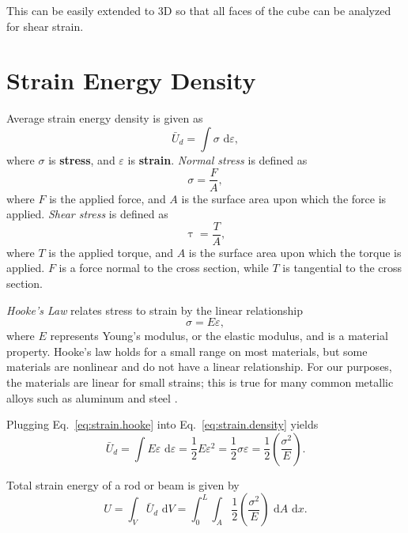This can be easily extended to 3D so that all faces of the cube can be analyzed for shear strain.

\section{Strain Energy Density}
Average strain energy density is given as
\begin{equation}
\bar U_d = \int \sigma \text{ d}\varepsilon,
\label{eq:strain.density}
\end{equation}
where $\sigma$ is \textbf{stress}, and $\varepsilon$ is \textbf{strain}. \emph{Normal stress} is defined as
\begin{equation}
\sigma = \frac{F}{A},
\label{eq:stress.force}
\end{equation}
where $F$ is the applied force, and $A$ is the surface area upon which the force is applied. 
\emph{Shear stress} is defined as
\begin{equation}
\uptau = \frac{T}{A},
\end{equation}
where $T$ is the applied torque, and $A$ is the surface area upon which the torque is applied. $F$ is a force normal to the cross section, while $T$ is tangential to the cross section.

\emph{Hooke's Law} relates stress to strain by the linear relationship
\begin{equation}
\sigma = E\varepsilon,
\label{eq:strain.hooke}
\end{equation}
where $E$ represents Young's modulus, or the elastic modulus, and is a material property. Hooke's law holds for a small range on most materials, but some materials are nonlinear and do not have a linear relationship. For our purposes, the materials are linear for small strains; this is true for many common metallic alloys such as aluminum and steel \cite{boulderstrain5}.

Plugging Eq.~\ref{eq:strain.hooke} into Eq.~\ref{eq:strain.density} yields
\begin{equation}
\bar U_d = \int E\varepsilon\text{ d}\varepsilon = \frac{1}{2} E\varepsilon^2 = \frac{1}{2}\sigma\varepsilon = \frac{1}{2}\left(\frac{\sigma^2}{E}\right).
\label{eq:strain.energy.final}
\end{equation}

Total strain energy of a rod or beam is given by
\begin{equation}
U = \int_V\bar U_d \text{ d}V = \int_0^L\int_A\frac{1}{2}\left(\frac{\sigma^2}{E}\right)\text{ d}A\text{ d}x.
\end{equation}

